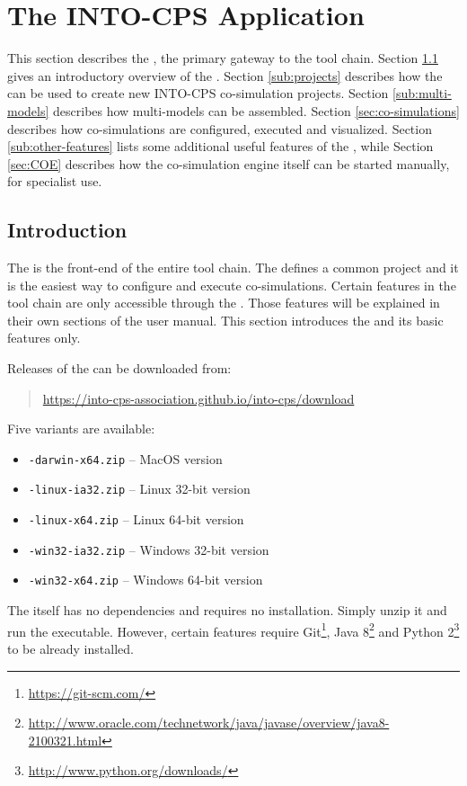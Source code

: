 \section{The INTO-CPS Application}\label{sec:app}
This section describes the \intoapp{}, the primary gateway to the \into tool chain.
%
Section \ref{sub:introduction} gives an introductory overview of the \intoapp{}.
%
Section \ref{sub:projects} describes how the \intoapp{} can be used to create new INTO-CPS co-simulation projects.
%
Section \ref{sub:multi-models} describes how multi-models can be assembled.
%
Section \ref{sec:co-simulations} describes how co-simulations are configured, executed and visualized.
%
Section \ref{sub:other-features} lists some additional useful features of the \intoapp{}, while Section \ref{sec:COE} describes how the co-simulation engine itself can be started manually, for specialist use.
%
%
%
\subsection{Introduction}
\label{sub:introduction}

The \intoapp{} is the front-end of the entire \into tool chain.
%
The \intoapp{} defines a common \into project and it is the easiest way to configure and execute co-simulations.
%
Certain features in the tool chain are only accessible through the \intoapp{}.
%
Those features will be explained in their own sections of the user manual.
%
This section introduces the \intoapp{} and its basic features only.

Releases of the \intoapp{} can be downloaded from:
%
%
%
\begin{quote}
  \url{https://into-cps-association.github.io/into-cps/download}
\end{quote}
%
%
% 
Five variants are available:
%
%
%
\begin{itemize}
  \item \texttt{-darwin-x64.zip} -- MacOS version
  \item \texttt{-linux-ia32.zip} -- Linux 32-bit version
  \item \texttt{-linux-x64.zip} -- Linux 64-bit version
  \item \texttt{-win32-ia32.zip} -- Windows 32-bit version
  \item \texttt{-win32-x64.zip} -- Windows 64-bit version
\end{itemize}
%
%
%
The \intoapp{} itself has no dependencies and requires no installation. Simply unzip it and run the executable. However, certain \intoapp{} features require
Git\footnote{\url{https://git-scm.com/}}, Java
8\footnote{\url{http://www.oracle.com/technetwork/java/javase/overview/java8-2100321.html}} and Python 2\footnote{\url{http://www.python.org/downloads/}} to be already installed.

